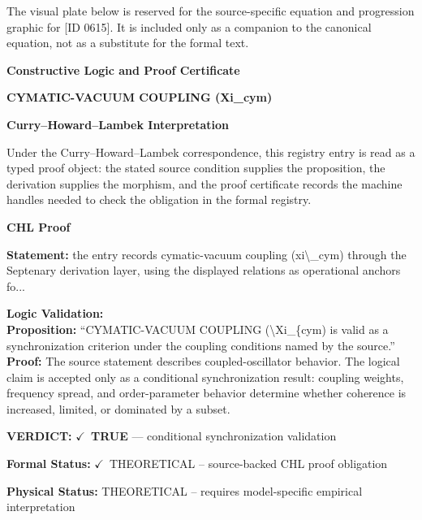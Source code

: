 \begingroup\footnotesize\sloppy
The visual plate below is reserved for the source-specific equation and progression graphic for [ID 0615]. It is included only as a companion to the canonical equation, not as a substitute for the formal text.
\par\endgroup
\ifTZPDarkEdition
{}
\fi

\clearpage
\begingroup\tzpsupportsetup
\noindent\textbf{\fontsize{10.8pt}{12.8pt}\selectfont [ID 0615] Constructive Logic and Proof Certificate}\par
\noindent\textbf{\fontsize{10pt}{12pt}\selectfont CYMATIC-VACUUM COUPLING (Xi\_cym)}\par
\vspace{0.45em}
\begingroup
\footnotesize
\setlength{\parskip}{0.22em}
\setlength{\parindent}{0pt}
\noindent\textbf{Curry--Howard--Lambek Interpretation}\par
Under the Curry--Howard--Lambek correspondence, this registry entry is read as a typed proof
object: the stated source condition supplies the proposition, the derivation supplies the
morphism, and the proof certificate records the machine handles needed to check the obligation
in the formal registry.

\vspace{0.45em}
\noindent\textbf{CHL Proof}\par
\textbf{Statement:} the entry records cymatic-vacuum coupling (xi\textbackslash{}\_cym) through the Septenary derivation
layer, using the displayed relations as operational anchors fo...

\textbf{Logic Validation:}\\
\textbf{Proposition:} ``CYMATIC-VACUUM COUPLING (\textbackslash{}Xi\_\{cym) is valid as a synchronization criterion under the
coupling conditions named by the source.''\\
\textbf{Proof:} The source statement describes coupled-oscillator behavior. The logical claim is
accepted only as a conditional synchronization result: coupling weights, frequency
spread, and order-parameter behavior determine whether coherence is increased, limited,
or dominated by a subset.

\textbf{VERDICT:} \ensuremath{\checkmark}\ \textbf{TRUE} --- conditional synchronization validation

\textbf{Formal Status:} \ensuremath{\checkmark}\ THEORETICAL -- source-backed CHL proof obligation

\textbf{Physical Status:} THEORETICAL -- requires model-specific empirical interpretation
\par\vspace{0.45em}
\par
\ifTZPDarkEdition
{}
\fi
\endgroup
\endgroup
